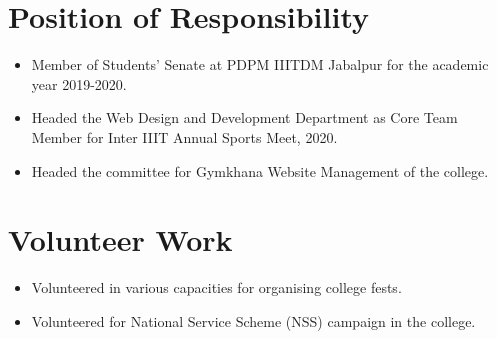 \documentclass[letterpaper,11pt]{article}
\newcommand{\resumeItemList}[1]{
  \vspace{-2pt}\item\small{
    { #1}
  }
}
\newcommand{\resumeSubItemList}[1]{\resumeItemList{#1}\vspace{-4pt}}
\newcommand{\resumeSubHeadingListStart}{\begin{itemize}[leftmargin=*]}
\newcommand{\resumeSubHeadingListEnd}{\end{itemize}}
\begin{document}
\section{Position of Responsibility}
  \resumeSubHeadingListStart
    \resumeSubItemList{Member of Students’ Senate at PDPM IIITDM Jabalpur for the academic year 2019-2020.}
    \resumeSubItemList{Headed the Web Design and Development Department as Core Team Member for Inter IIIT Annual Sports Meet, 2020.}
    \resumeSubItemList{Headed the committee for Gymkhana Website Management of the college.}
  \resumeSubHeadingListEnd

\section{Volunteer Work}
  \resumeSubHeadingListStart
    \resumeSubItemList{Volunteered in various capacities for organising college fests.}
    \resumeSubItemList{Volunteered for National Service Scheme (NSS) campaign in the college.}
  \resumeSubHeadingListEnd
\end{document}

